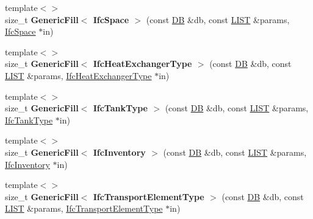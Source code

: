 \begin{DoxyCompactItemize}
\item 
\hypertarget{namespace_assimp_1_1_s_t_e_p_aa4b2b499ef377b4f51f34070ab085752}{{\footnotesize template$<$$>$ }\\size\+\_\+t {\bfseries Generic\+Fill$<$ Ifc\+Space $>$} (const \hyperlink{class_assimp_1_1_s_t_e_p_1_1_d_b}{D\+B} \&db, const \hyperlink{class_assimp_1_1_s_t_e_p_1_1_e_x_p_r_e_s_s_1_1_l_i_s_t}{L\+I\+S\+T} \&params, \hyperlink{struct_assimp_1_1_i_f_c_1_1_ifc_space}{Ifc\+Space} $\ast$in)}\label{namespace_assimp_1_1_s_t_e_p_aa4b2b499ef377b4f51f34070ab085752}

\item 
\hypertarget{namespace_assimp_1_1_s_t_e_p_a6d7ab8acd7d05f6daf2874da0ed246aa}{{\footnotesize template$<$$>$ }\\size\+\_\+t {\bfseries Generic\+Fill$<$ Ifc\+Heat\+Exchanger\+Type $>$} (const \hyperlink{class_assimp_1_1_s_t_e_p_1_1_d_b}{D\+B} \&db, const \hyperlink{class_assimp_1_1_s_t_e_p_1_1_e_x_p_r_e_s_s_1_1_l_i_s_t}{L\+I\+S\+T} \&params, \hyperlink{struct_assimp_1_1_i_f_c_1_1_ifc_heat_exchanger_type}{Ifc\+Heat\+Exchanger\+Type} $\ast$in)}\label{namespace_assimp_1_1_s_t_e_p_a6d7ab8acd7d05f6daf2874da0ed246aa}

\item 
\hypertarget{namespace_assimp_1_1_s_t_e_p_a2a7fc496eb4e287b3169e4a0beab38d5}{{\footnotesize template$<$$>$ }\\size\+\_\+t {\bfseries Generic\+Fill$<$ Ifc\+Tank\+Type $>$} (const \hyperlink{class_assimp_1_1_s_t_e_p_1_1_d_b}{D\+B} \&db, const \hyperlink{class_assimp_1_1_s_t_e_p_1_1_e_x_p_r_e_s_s_1_1_l_i_s_t}{L\+I\+S\+T} \&params, \hyperlink{struct_assimp_1_1_i_f_c_1_1_ifc_tank_type}{Ifc\+Tank\+Type} $\ast$in)}\label{namespace_assimp_1_1_s_t_e_p_a2a7fc496eb4e287b3169e4a0beab38d5}

\item 
\hypertarget{namespace_assimp_1_1_s_t_e_p_a5149c0af6d80c2b1c39818718f8261bb}{{\footnotesize template$<$$>$ }\\size\+\_\+t {\bfseries Generic\+Fill$<$ Ifc\+Inventory $>$} (const \hyperlink{class_assimp_1_1_s_t_e_p_1_1_d_b}{D\+B} \&db, const \hyperlink{class_assimp_1_1_s_t_e_p_1_1_e_x_p_r_e_s_s_1_1_l_i_s_t}{L\+I\+S\+T} \&params, \hyperlink{struct_assimp_1_1_i_f_c_1_1_ifc_inventory}{Ifc\+Inventory} $\ast$in)}\label{namespace_assimp_1_1_s_t_e_p_a5149c0af6d80c2b1c39818718f8261bb}

\item 
\hypertarget{namespace_assimp_1_1_s_t_e_p_a86690a7dc3daef432cd57a2598320e0d}{{\footnotesize template$<$$>$ }\\size\+\_\+t {\bfseries Generic\+Fill$<$ Ifc\+Transport\+Element\+Type $>$} (const \hyperlink{class_assimp_1_1_s_t_e_p_1_1_d_b}{D\+B} \&db, const \hyperlink{class_assimp_1_1_s_t_e_p_1_1_e_x_p_r_e_s_s_1_1_l_i_s_t}{L\+I\+S\+T} \&params, \hyperlink{struct_assimp_1_1_i_f_c_1_1_ifc_transport_element_type}{Ifc\+Transport\+Element\+Type} $\ast$in)}\label{namespace_assimp_1_1_s_t_e_p_a86690a7dc3daef432cd57a2598320e0d}


\end{DoxyCompactItemize}

